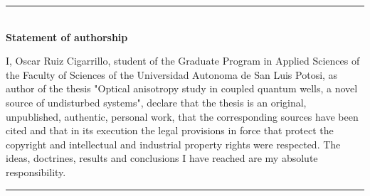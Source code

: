 \cleardoublepage
\begin{vcentrepage}

	\noindent\rule[2pt]{\textwidth}{0.8pt}\\
	{\large\textbf{Statement of authorship }}
	\begin{center}
		\justifying
        I, Oscar Ruiz Cigarrillo, student of the Graduate Program in Applied Sciences of the Faculty of Sciences of the Universidad Autonoma de San Luis Potosi, as author of the thesis "Optical anisotropy study in coupled quantum wells, a novel source of undisturbed systems", declare that the thesis is an original, unpublished, authentic, personal work, that the corresponding sources have been cited and that in its execution the legal provisions in force that protect the copyright and intellectual and industrial property rights were respected. The ideas, doctrines, results and conclusions I have reached are my absolute responsibility.
	\end{center}
	\noindent\rule[2pt]{\textwidth}{0.8pt}

\end{vcentrepage}

%